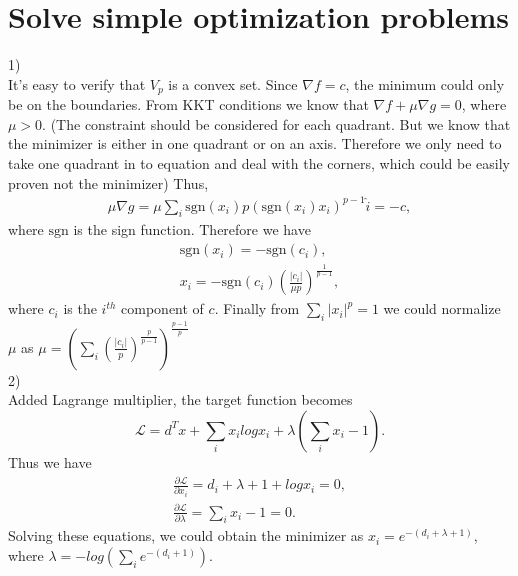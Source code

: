 \documentclass{article}
\begin{document}
\section{Solve simple optimization problems}
1)\\
It's easy to verify that $V_p$ is a convex set. Since $\nabla f = c$, the minimum could only be on the boundaries. From KKT conditions we know that $\nabla f +\mu\nabla g = 0$, where $\mu>0$. (The constraint should be considered for each quadrant. But we know that the minimizer is either in one quadrant or on an axis. Therefore we only need to take one quadrant in to equation and deal with the corners, which could be easily proven not the minimizer) Thus,
\begin{gather*}
\mu\nabla g = \mu\sum_i\mathrm{sgn}(x_i)p(\mathrm{sgn}(x_i)x_i)^{p-1}\hat{i}=-c,
\end{gather*}
where $\mathrm{sgn}$ is the sign function. Therefore we have 
\begin{align*}
\mathrm{sgn}(x_i) = -\mathrm{sgn}(c_i),\\
x_i = -\mathrm{sgn}(c_i)(\frac{|c_i|}{\mu p})^\frac{1}{p-1},
\end{align*}
where $c_i$ is the $i^{th}$ component of $c$. Finally from $\sum_i|x_i|^p=1$ we could normalize $\mu$ as $\mu = (\sum_i(\frac{|c_i|}{p})^\frac{p}{p-1})^\frac{p-1}{p}$\\
2)\\
Added Lagrange multiplier, the target function becomes
$$\mathcal{L}=d^Tx+\sum_ix_ilogx_i+\lambda(\sum_ix_i-1).$$
Thus we have
\begin{gather*}
\frac{\partial\mathcal{L}}{\partial x_i}=d_i+\lambda+1+logx_i=0,\\
\frac{\partial\mathcal{L}}{\partial \lambda}=\sum_ix_i-1=0.
\end{gather*}
Solving these equations, we could obtain the minimizer as $x_i = e^{-(d_i+\lambda+1)}$, where $\lambda = -log(\sum_ie^{-(d_i+1)})$.
\end{document}
